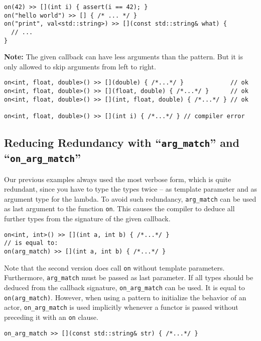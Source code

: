 \begin{lstlisting}
on(42) >> [](int i) { assert(i == 42); }
on("hello world") >> [] { /* ... */ }
on("print", val<std::string>) >> [](const std::string& what) {
  // ...
}
\end{lstlisting}

\textbf{Note:} The given callback can have less arguments than the pattern.
But it is only allowed to skip arguments from left to right.

\begin{lstlisting}
on<int, float, double>() >> [](double) { /*...*/ }             // ok
on<int, float, double>() >> [](float, double) { /*...*/ }      // ok
on<int, float, double>() >> [](int, float, double) { /*...*/ } // ok

on<int, float, double>() >> [](int i) { /*...*/ } // compiler error
\end{lstlisting}

\subsection{Reducing Redundancy with ``\lstinline^arg_match^'' and ``\lstinline^on_arg_match^''}

Our previous examples always used the most verbose form, which is quite redundant, since you have to type the types twice -- as template parameter and as argument type for the lambda.
To avoid such redundancy, \lstinline^arg_match^ can be used as last argument to the function \lstinline^on^.
This causes the compiler to deduce all further types from the signature of the given callback.

\begin{lstlisting}
on<int, int>() >> [](int a, int b) { /*...*/ }
// is equal to:
on(arg_match) >> [](int a, int b) { /*...*/ }
\end{lstlisting}

Note that the second version does call \lstinline^on^ without template parameters.
Furthermore, \lstinline^arg_match^ must be passed as last parameter.
If all types should be deduced from the callback signature, \lstinline^on_arg_match^ can be used.
It is equal to \lstinline^on(arg_match)^.
However, when using a pattern to initialize the behavior of an actor, \lstinline^on_arg_match^ is used implicitly whenever a functor is passed without preceding it with an \lstinline^on^ clause.

\begin{lstlisting}
on_arg_match >> [](const std::string& str) { /*...*/ }
\end{lstlisting}

